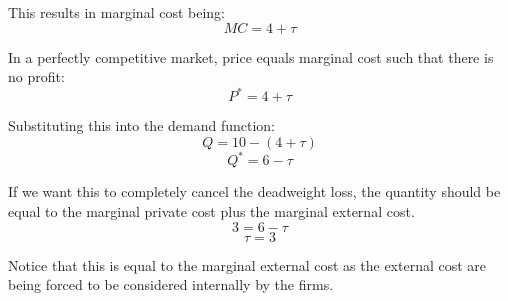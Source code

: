 \documentclass{article}
\begin{document}
\begin{enumerate}[1.]
        This results in marginal cost being:
        $$ MC = 4 + \tau $$

        In a perfectly competitive market, price equals marginal cost such that
        there is no profit:
        $$ P^{*} = 4 + \tau $$

        Substituting this into the demand function:
        $$ Q = 10 - ( 4 + \tau ) $$
        $$ Q^{*} = 6 - \tau $$

        If we want this to completely cancel the deadweight loss, the quantity
        should be equal to the marginal private cost plus the marginal external
        cost.
        $$ 3 = 6 - \tau $$
        $$ \tau = 3 $$

        Notice that this is equal to the marginal external cost as the external
        cost are being forced to be considered internally by the firms.

\end{enumerate}
\end{document}
